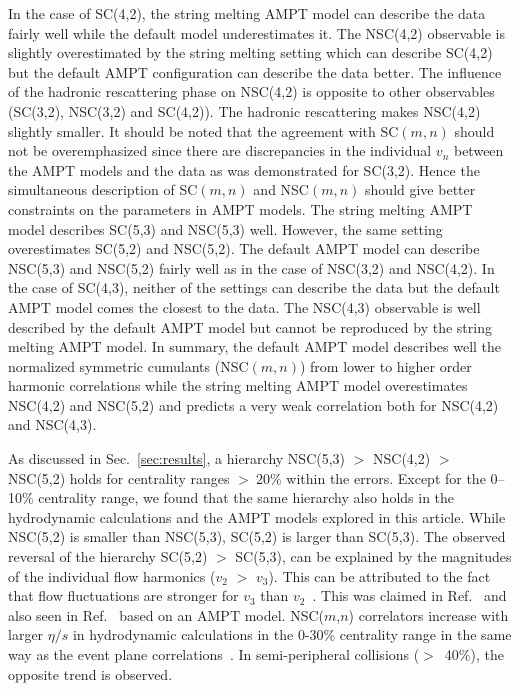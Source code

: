 In the case of SC(4,2), the string melting AMPT model can describe the data fairly well while the default model underestimates it.
The NSC(4,2) observable is slightly overestimated by the string melting setting which can describe SC(4,2) but the default AMPT configuration can describe the data better.
The influence of the hadronic rescattering phase on NSC(4,2) is opposite to other observables (SC(3,2), NSC(3,2) and SC(4,2)). The hadronic rescattering makes NSC(4,2) slightly smaller.
It should be noted that the agreement with SC$(m,n)$ should not be overemphasized since there are discrepancies in the individual $v_n$ between the AMPT models and the data as was demonstrated for SC(3,2).
Hence the simultaneous description of SC$(m,n)$ and NSC$(m,n)$ should give better constraints on the parameters in AMPT models.
The string melting AMPT model describes SC(5,3) and NSC(5,3) well. However, the same setting overestimates SC(5,2) and NSC(5,2). 
The default AMPT model can describe NSC(5,3) and NSC(5,2) fairly well as in the case of NSC(3,2) and NSC(4,2).
In the case of SC(4,3), neither of the settings can describe the data but the default AMPT model comes the closest to the data. 
The NSC(4,3) observable is well described by the default AMPT model but cannot be reproduced by the string melting AMPT model.
In summary, the default AMPT model describes well the normalized symmetric cumulants (NSC$(m,n)$) from lower to higher order harmonic correlations while the string melting AMPT model overestimates NSC(4,2) and NSC(5,2) and predicts a very weak correlation both for NSC(4,2) and NSC(4,3). 

As discussed in Sec.~\ref{sec:results}, a hierarchy NSC(5,3) $>$ NSC(4,2) $>$ NSC(5,2) holds for centrality ranges $>~20\%$ within the errors.
Except for the 0--10\% centrality range, we found that the same hierarchy also holds in the hydrodynamic calculations and the AMPT models explored in this article.
While NSC(5,2) is smaller than NSC(5,3), SC(5,2) is larger than SC(5,3).
The observed reversal of the hierarchy SC(5,2) $>$ SC(5,3), can be explained by the magnitudes of the individual flow harmonics ($v_2$ $>$ $v_3$). 
This can be attributed to the fact that flow fluctuations are stronger for $v_3$ than $v_2$~\cite{Aad:2013xma}. This was claimed in Ref.~\cite{Zhu:2016puf} and also seen in Ref.~\cite{Bhalerao:2014xra} based on an AMPT model. 
NSC($m$,$n$) correlators increase with larger $\eta/s$ in hydrodynamic calculations in the 0-30\% centrality range in the same way as the event plane correlations~\cite{Bhalerao:2013ina,Teaney:2013dta}. In semi-peripheral collisions ($>$~40\%), the opposite trend is observed.

